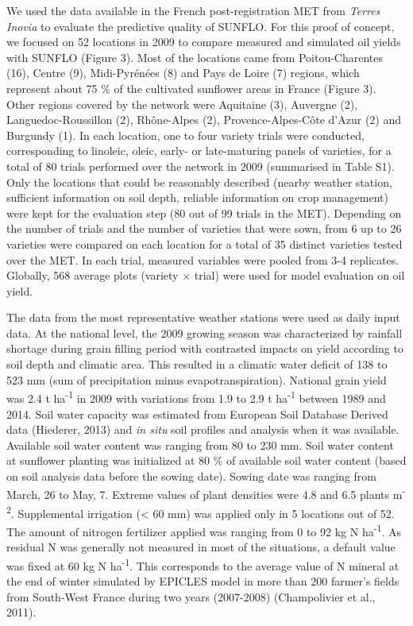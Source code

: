 \documentclass[a4paper]{article}
\begin{document}
We used the data available in the French post-registration MET from
\emph{Terres Inovia} to evaluate the predictive quality of SUNFLO. For
this proof of concept, we focused on 52 locations in 2009 to compare
measured and simulated oil yields with SUNFLO (Figure 3). Most of the
locations came from Poitou-Charentes (16), Centre (9), Midi-Pyrénées (8)
and Pays de Loire (7) regions, which represent about 75 \% of the
cultivated sunflower areas in France (Figure 3). Other regions covered
by the network were Aquitaine (3), Auvergne (2), Languedoc-Roussillon
(2), Rhône-Alpes (2), Provence-Alpes-Côte d'Azur (2) and Burgundy (1).
In each location, one to four variety trials were conducted,
corresponding to linoleic, oleic, early- or late-maturing panels of
varieties, for a total of 80 trials performed over the network in 2009
(summarised in Table S1). Only the locations that could be reasonably
described (nearby weather station, sufficient information on soil depth,
reliable information on crop management) were kept for the evaluation
step (80 out of 99 trials in the MET). Depending on the number of trials
and the number of varieties that were sown, from 6 up to 26 varieties
were compared on each location for a total of 35 distinct varieties
tested over the MET. In each trial, measured variables were pooled from
3-4 replicates. Globally, 568 average plots (variety \(\times\) trial)
were used for model evaluation on oil yield.

The data from the most representative weather stations were used as
daily input data. At the national level, the 2009 growing season was
characterized by rainfall shortage during grain filling period with
contrasted impacts on yield according to soil depth and climatic area.
This resulted in a climatic water deficit of 138 to 523 mm (sum of
precipitation minus evapotranspiration). National grain yield was 2.4 t
ha\textsuperscript{-1} in 2009 with variations from 1.9 to 2.9 t
ha\textsuperscript{-1} between 1989 and 2014. Soil water capacity was
estimated from European Soil Database Derived data (Hiederer, 2013) and
\emph{in situ} soil profiles and analysis when it was available.
Available soil water content was ranging from 80 to 230 mm. Soil water
content at sunflower planting was initialized at 80 \% of available soil
water content (based on soil analysis data before the sowing date).
Sowing date was ranging from March, 26 to May, 7. Extreme values of
plant densities were 4.8 and 6.5 plants m\textsuperscript{-2}.
Supplemental irrigation (\textless{} 60 mm) was applied only in 5
locations out of 52. The amount of nitrogen fertilizer applied was
ranging from 0 to 92 kg N ha\textsuperscript{-1}. As residual N was
generally not measured in most of the situations, a default value was
fixed at 60 kg N ha\textsuperscript{-1}. This corresponds to the average
value of N mineral at the end of winter simulated by EPICLES model in
more than 200 farmer's fields from South-West France during two years
(2007-2008) (Champolivier et al., 2011).
\end{document}
